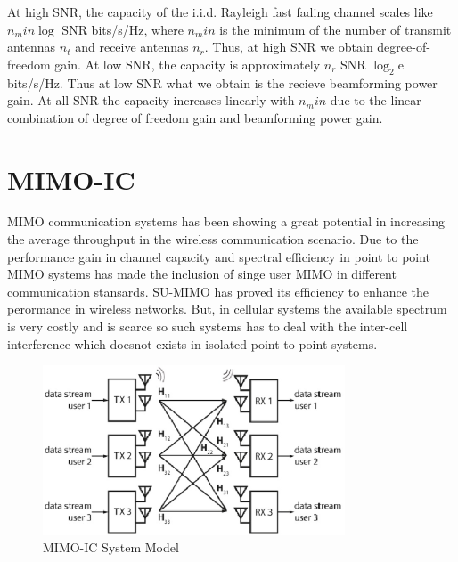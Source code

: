 \documentclass[a4paper, 12pt,titlepage]{dithesis} %
\newcommand{\me}[1]{\( #1 \)}
\begin{document}
At high \ac{SNR}, the capacity of the i.i.d. Rayleigh fast fading channel scales like \me{n_min \log} SNR bits/s/Hz, where \me{n_min} is the minimum of the number of transmit antennas \me{n_t} and receive antennas \me{n_r}. Thus, at high \ac{SNR} we obtain degree-of-freedom gain. At low \ac{SNR}, the capacity is approximately \me{n_r} SNR \me{\log_2}e bits/s/Hz. Thus at low \ac{SNR} what we obtain is the recieve beamforming power gain. At all \ac{SNR} the capacity increases linearly with \me{n_min} due to the linear combination of degree of freedom gain and beamforming power gain.


\section{MIMO-IC}
\ac{MIMO} communication systems has been showing a great potential in increasing the average throughput in the wireless communication scenario. Due to the performance gain in channel capacity and spectral efficiency in point to point \ac{MIMO} systems has made the inclusion of singe user \ac{MIMO} in different communication stansards. SU-\ac{MIMO} has proved its efficiency to enhance the perormance in wireless networks. But, in cellular systems the available spectrum is very costly and is scarce so such systems has to deal with the inter-cell interference which doesnot exists in isolated point to point systems.

\begin{figure}[h]
	\begin{center}
		\includegraphics[width= 0.8\textwidth]{mimoibc.eps}
		\caption{MIMO-IC System Model}
	\end{center}
\end{figure}
\end{document}
